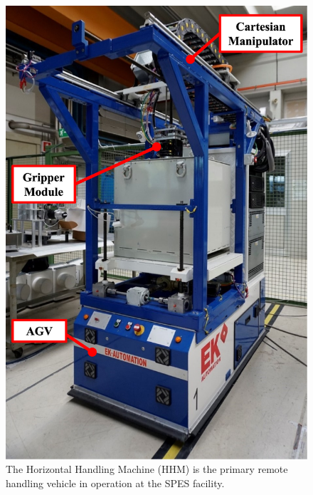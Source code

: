 \begin{bibunit}
\begin{figure}[h!]
    \centering
    \includegraphics[width=0.8\columnwidth]{MX_Papers/Paper4/pictures/lilli01.eps}
    \caption{The Horizontal Handling Machine (HHM) is the primary remote handling vehicle in operation at the SPES facility.} 
    \label{fig:hhm}
\end{figure}


\end{bibunit}
